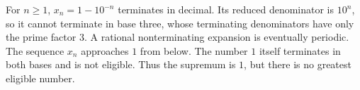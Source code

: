 For $ n\ge1 $, $ x_n=1-10^{-n}$ terminates in decimal. Its reduced denominator is $ 10^n $, so it cannot terminate in base three, whose terminating denominators have only the prime factor $ 3 $. A rational nonterminating expansion is eventually periodic. The sequence $ x_n $ approaches $ 1 $ from below. The number $ 1 $ itself terminates in both bases and is not eligible. Thus the supremum is $\boxed1 $, but there is no greatest eligible number.
